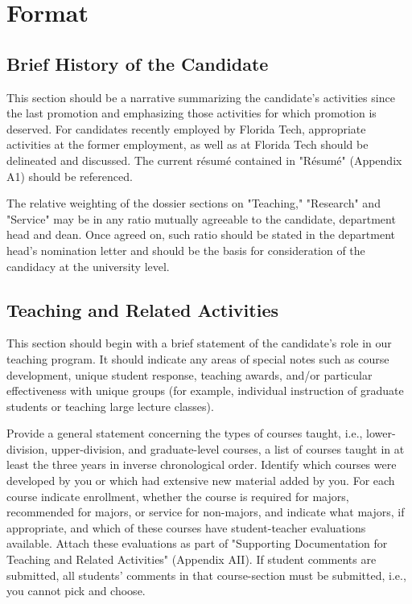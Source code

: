 \section*{Format}
\subsection*{Brief History of the Candidate}
This section should be a narrative summarizing the candidate’s activities since the last promotion and emphasizing those activities for which promotion is deserved. For candidates recently employed by Florida Tech, appropriate activities at the former employment, as well as at Florida Tech should be delineated and discussed. The current résumé contained in "Résumé" (Appendix A1) should be referenced.

The relative weighting of the dossier sections on "Teaching," "Research" and "Service" may be in any ratio mutually agreeable to the candidate, department head and dean. Once agreed on, such ratio should be stated in the department head’s nomination letter and should be the basis for consideration of the candidacy at the university level.

\subsection*{Teaching and Related Activities}
This section should begin with a brief statement of the candidate’s role in our teaching program. It should indicate any areas of special notes such as course development, unique student response, teaching awards, and/or particular effectiveness with unique groups (for example, individual instruction of graduate students or teaching large lecture classes).

Provide a general statement concerning the types of courses taught, i.e., lower-division, upper-division, and graduate-level courses, a list of courses taught in at least the three years in inverse chronological order. Identify which courses were developed by you or which had extensive new material added by you. For each course indicate enrollment, whether the course is required for majors, recommended for majors, or service for non-majors, and indicate what majors, if appropriate, and which of these courses have student-teacher evaluations available. Attach these evaluations as part of "Supporting Documentation for Teaching and Related Activities" (Appendix AII). If student comments are submitted, all students' comments in that course-section must be submitted, i.e., you cannot pick and choose.

